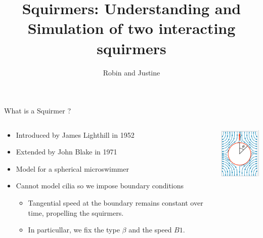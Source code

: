 \documentclass{beamer}
\title{Squirmers: Understanding and Simulation of two interacting squirmers}
\author{Robin and Justine}
\begin{document}
\begin{frame}
    \titlepage
\end{frame}

\begin{frame}{What is a Squirmer ?}
    \begin{columns}[T]
        \begin{column}{0.5\textwidth}
            \begin{itemize}
                \item Introduced by James Lighthill in 1952 \cite{Wikipedia}
                \item Extended by John Blake in 1971 \cite{Wikipedia}
                \item Model for a spherical microswimmer
                \item Cannot model cilia so we impose boundary conditions
                \begin{itemize}
                    \item Tangential speed at the boundary remains constant over time, propelling the squirmers.
                    \item In particullar, we fix the type $\beta$ and the speed $B1$.
                \end{itemize}
            \end{itemize}
        \end{column}
        \begin{column}{0.5\textwidth}
            \centering
            \includegraphics[width=\textwidth]{images/squirmer.png}
            \cite{Wikipedia}
        \end{column}
    \end{columns}
\end{frame}
\end{document}
